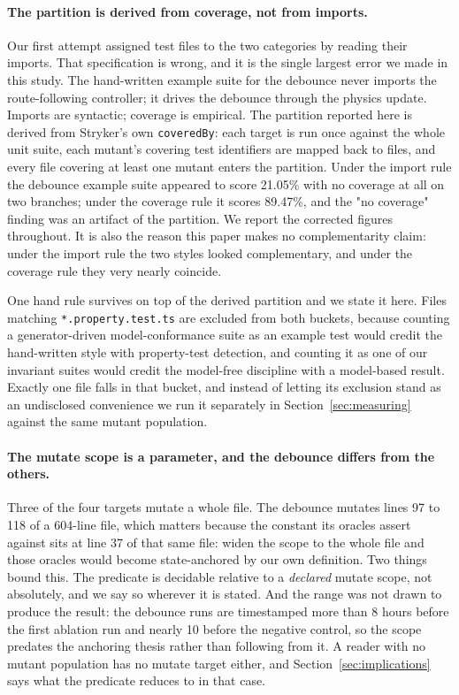 \documentclass[12pt]{article}
\begin{document}
\paragraph{The partition is derived from coverage, not from imports.} Our first
attempt assigned test files to the two categories by reading their imports. That
specification is wrong, and it is the single largest error we made in this study.
The hand-written example suite for the debounce never
imports the route-following controller; it drives the debounce through the
physics update. Imports are syntactic; coverage is empirical. The partition
reported here is derived from Stryker's own \texttt{coveredBy}: each target is
run once against the whole unit suite, each mutant's covering test identifiers
are mapped back to files, and every file covering at least one mutant enters the
partition. Under the import rule the debounce example suite appeared to score
21.05\% with no coverage at all on two branches; under the coverage rule it
scores 89.47\%, and the "no coverage" finding was an artifact of the partition. We report the corrected figures
throughout. It is also the reason this paper makes no complementarity claim: under
the import rule the two styles looked complementary, and under the coverage rule
they very nearly coincide.

One hand rule survives on top of the derived partition and we state it here. Files matching \texttt{*.property.test.ts} are
excluded from both buckets, because counting a generator-driven model-conformance
suite as an example test would credit the hand-written style with property-test
detection, and counting it as one of our invariant suites would credit the
model-free discipline with a model-based result. Exactly one file falls in that
bucket, and instead of letting its exclusion stand as an undisclosed convenience we
run it separately in Section~\ref{sec:measuring} against the same mutant
population.

\paragraph{The mutate scope is a parameter, and the debounce differs from the
others.} Three of the four targets mutate a whole file. The debounce mutates
lines 97 to 118 of a 604-line file, which matters because the constant its oracles
assert against sits at line 37 of that same file: widen the scope to the whole
file and those oracles would become state-anchored by our own definition. Two
things bound this. The predicate is decidable relative to a \emph{declared} mutate
scope, not absolutely, and we say so wherever it is stated. And the range was not
drawn to produce the result: the debounce runs are timestamped more than 8 hours before the first ablation run and nearly 10 before the negative control, so
the scope predates the anchoring thesis rather than following from it. A reader
with no mutant population has no mutate target either, and
Section~\ref{sec:implications} says what the predicate reduces to in that case.
\end{document}
